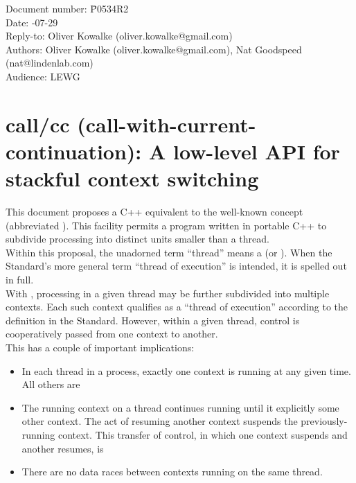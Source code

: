 \documentclass[fontsize=10pt,paper=A4,pagesize,DIV=15]{scrartcl}
\begin{document}
\small
\begin{tabbing}
    Document number: \= P0534R2\\
    Date:            -07-29\\
    Reply-to:        \> Oliver Kowalke (oliver.kowalke@gmail.com)\\
    Authors:         \> Oliver Kowalke (oliver.kowalke@gmail.com), Nat Goodspeed (nat@lindenlab.com)\\
    Audience:        \> LEWG\\
\end{tabbing}

\section*{call/cc (call-with-current-continuation): A low-level API for stackful context switching}


\tableofcontents


This document proposes a C++ equivalent to the well-known concept
 (abbreviated ). This
facility permits a program written in portable C++ to subdivide processing into
distinct  units smaller than a thread.\\

Within this proposal, the unadorned term ``thread'' means a 
(or ).
When the Standard's more general term ``thread of execution'' is intended, it
is spelled out in full.\\

With \cc, processing in a given thread may be further subdivided into multiple
contexts. Each such context qualifies as a ``thread of execution'' according
to the definition in the Standard. However, within a given thread, control is
cooperatively passed from one context to another.\\

This has a couple of important implications:

\begin{itemize}
\item In each thread in a process, exactly one context is running at any given
  time. All others are 
\item The running context on a thread continues running until it explicitly
   some other context. The act of resuming another context
  suspends the previously-running context. This transfer of control, in which
  one context suspends and another resumes, is 
\item There are no data races between contexts running on the same thread.
\end{itemize}
\end{document}
